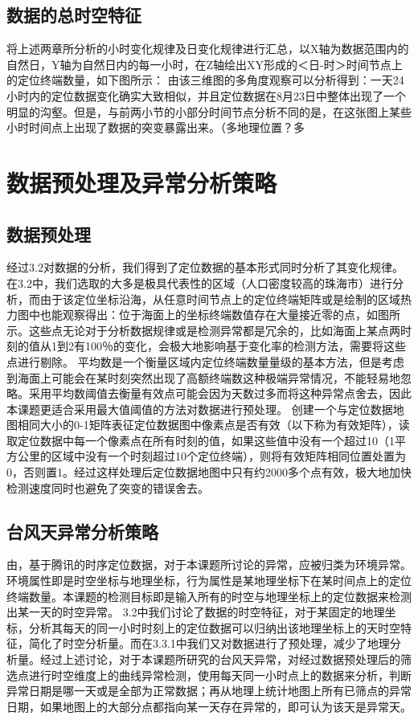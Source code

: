 \documentclass[a4paper,AutoFakeBold,oneside,12pt]{book}
\begin{document}
{{\subsection{数据的总时空特征}
将上述两章所分析的小时变化规律及日变化规律进行汇总，以X轴为数据范围内的自然日，Y轴为自然日内的每一小时，在Z轴绘出XY形成的＜日-时＞时间节点上的定位终端数量，如下图所示：
	由该三维图的多角度观察可以分析得到：一天24小时内的定位数据变化确实大致相似，并且定位数据在8月23日中整体出现了一个明显的沟壑。但是，与前两小节的小部分时间节点分析不同的是，在这张图上某些小时时间点上出现了数据的突变暴露出来。（多地理位置？多

\section{数据预处理及异常分析策略}

\subsection{数据预处理}
经过3.2对数据的分析，我们得到了定位数据的基本形式同时分析了其变化规律。在3.2中，我们选取的大多是极具代表性的区域（人口密度较高的珠海市）进行分析，而由于该定位坐标沿海，从任意时间节点上的定位终端矩阵或是绘制的区域热力图中也能观察得出：位于海面上的坐标终端数值存在大量接近零的点，如图所示。这些点无论对于分析数据规律或是检测异常都是冗余的，比如海面上某点两时刻的值从1到2有100％的变化，会极大地影响基于变化率的检测方法，需要将这些点进行剔除。
	平均数是一个衡量区域内定位终端数量量级的基本方法，但是考虑到海面上可能会在某时刻突然出现了高额终端数这种极端异常情况，不能轻易地忽略。采用平均数阈值去衡量有效点可能会因为天数过多而将这种异常点舍去，因此本课题更适合采用最大值阈值的方法对数据进行预处理。
	创建一个与定位数据地图相同大小的0-1矩阵表征定位数据图中像素点是否有效（以下称为有效矩阵），读取定位数据中每一个像素点在所有时刻的值，如果这些值中没有一个超过10（1平方公里的区域中没有一个时刻超过10个定位终端），则将有效矩阵相同位置处置为0，否则置1。经过这样处理后定位数据地图中只有约2000多个点有效，极大地加快检测速度同时也避免了突变的错误舍去。
\subsection{台风天异常分析策略}
由，基于腾讯的时序定位数据，对于本课题所讨论的异常，应被归类为环境异常。环境属性即是时空坐标与地理坐标，行为属性是某地理坐标下在某时间点上的定位终端数量。本课题的检测目标即是输入所有的时空与地理坐标上的定位数据来检测出某一天的时空异常。
	3.2中我们讨论了数据的时空特征，对于某固定的地理坐标，分析其每天的同一小时时刻上的定位数据可以归纳出该地理坐标上的天时空特征，简化了时空分析量。而在3.3.1中我们又对数据进行了预处理，减少了地理分析量。经过上述讨论，对于本课题所研究的台风天异常，对经过数据预处理后的筛选点进行时空维度上的曲线异常检测，使用每天同一小时点上的数据来分析，判断异常日期是哪一天或是全部为正常数据；再从地理上统计地图上所有已筛点的异常日期，如果地图上的大部分点都指向某一天存在异常的，即可认为该天是异常天。

}}
\end{document}
